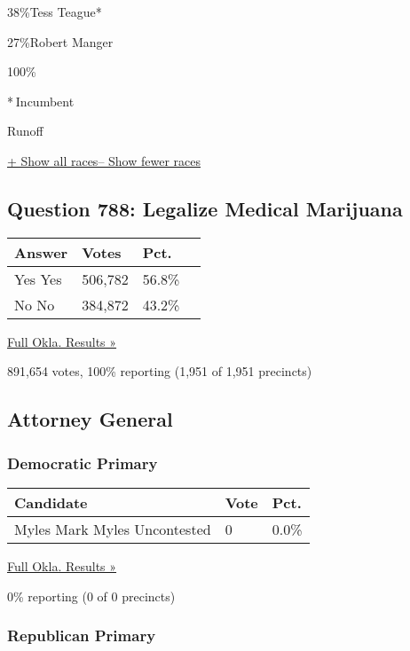 38\%Tess Teague*

 27\%Robert Manger

100\%

* Incumbent~

 Runoff

\protect\hyperlink{}{+ Show all races-- Show fewer races}

\hypertarget{question-788-legalize-medical-marijuana}{%
\subsection{Question 788: Legalize Medical
Marijuana}\label{question-788-legalize-medical-marijuana}}

\begin{longtable}[]{@{}llll@{}}
\toprule
Answer & Votes & Pct. &\tabularnewline
\midrule
\endhead
 Yes Yes & 506,782 & 56.8\% &\tabularnewline
 No No & 384,872 & 43.2\% &\tabularnewline
\bottomrule
\end{longtable}

\href{https://www.nytimes3xbfgragh.onion/elections/results/oklahoma}{Full
Okla. Results »}

891,654 votes, 100\% reporting (1,951 of 1,951 precincts)

\hypertarget{attorney-general}{%
\subsection{Attorney General}\label{attorney-general}}

\hypertarget{democratic-primary-7}{%
\subsubsection{Democratic Primary}\label{democratic-primary-7}}

\begin{longtable}[]{@{}lll@{}}
\toprule
Candidate & Vote & Pct.\tabularnewline
\midrule
\endhead
 Myles Mark Myles Uncontested & 0 & 0.0\%\tabularnewline
\bottomrule
\end{longtable}

\href{https://www.nytimes3xbfgragh.onion/elections/results/oklahoma}{Full
Okla. Results »}

0\% reporting (0 of 0 precincts)

\hypertarget{republican-primary-7}{%
\subsubsection{Republican Primary}\label{republican-primary-7}}

